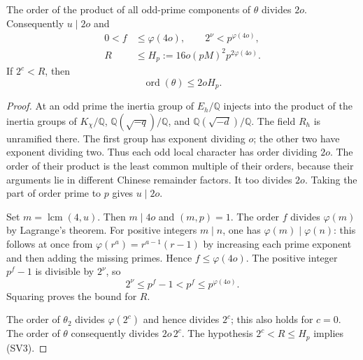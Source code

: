 \begin{lemma}\label{sv-order}
The order of the product of all odd-prime components of
$\theta$ divides $2o$. Consequently $u\mid2o$ and
\[
 \begin{split}
 0<f&\le\varphi(4o),\qquad 2^\nu<p^{\varphi(4o)},\\
 R&\le H_p:=16o(pM)^2p^{2\varphi(4o)}.
 \end{split}                                                   \tag{SV2}
\]
If $2^c<R$, then
\[
                       \operatorname{ord}(\theta)\le2oH_p.
                                                               \tag{SV3}
\]
\end{lemma}
\begin{proof}
At an odd prime the inertia group of $E_h/\mathbb Q$ injects
into the product of the inertia groups of
$K_\chi/\mathbb Q$, $\mathbb Q(\sqrt{-q})/\mathbb Q$, and
$\mathbb Q(\sqrt{-d})/\mathbb Q$. The field $R_h$ is
unramified there. The first group has exponent dividing $o$;
the other two have exponent dividing two. Thus each odd local
character has order dividing $2o$. The order of their product
is the least common multiple of their orders, because their
arguments lie in different Chinese remainder factors. It too
divides $2o$. Taking the part of order prime to $p$ gives
$u\mid2o$.

Set $m=\operatorname{lcm}(4,u)$. Then $m\mid4o$ and
$(m,p)=1$. The order $f$ divides $\varphi(m)$ by Lagrange's
theorem. For positive integers $m\mid n$, one has
$\varphi(m)\mid\varphi(n)$: this follows at once from
$\varphi(r^a)=r^{a-1}(r-1)$ by increasing each prime exponent
and then adding the missing primes. Hence
$f\le\varphi(4o)$. The positive integer $p^f-1$ is divisible
by $2^\nu$, so
\[
                 2^\nu\le p^f-1<p^f\le p^{\varphi(4o)}.
\]
Squaring proves the bound for $R$.

The order of $\theta_2$ divides $\varphi(2^c)$ and hence
divides $2^c$; this also holds for $c=0$. The order of
$\theta$ consequently divides $2o\,2^c$. The hypothesis
$2^c<R\le H_p$ implies (SV3).
\end{proof}

